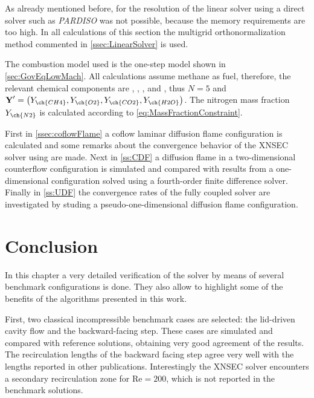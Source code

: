 As already mentioned before, for the resolution of the linear solver using a direct solver such as \textit{PARDISO} was not possible, because the memory requirements are too high. In all calculations of this section the multigrid orthonormalization method commented in \cref{ssec:LinearSolver} is used.

The combustion model used is the one-step model shown in \cref{sec:GovEqLowMach}. All calculations assume methane as fuel, therefore, the relevant chemical components are , , ,  and , thus $N = 5$ and $\vec{Y}' = \left(Y_{\ch{CH4}},Y_{\ch{O2}},Y_{\ch{CO2}},Y_{\ch{H2O}}\right)$. The nitrogen mass fraction $Y_{\ch{N2}}$ is calculated according to \cref{eq:MassFractionConstraint}.%

First in \cref{ssec:coflowFlame} a coflow laminar diffusion flame configuration is calculated and some remarks about the convergence behavior of the XNSEC solver using are made. Next in \cref{ss:CDF} a diffusion flame in a two-dimensional counterflow configuration is simulated and compared with results from a one-dimensional configuration solved using a fourth-order finite difference solver. Finally in \cref{ss:UDF} the convergence rates of the fully coupled solver are investigated by studing a pseudo-one-dimensional diffusion flame configuration.





\section{Conclusion}
In this chapter a very detailed verification of the solver by means of several benchmark configurations is done. They also allow to highlight some of the benefits of the algorithms presented in this work.

First, two classical incompressible benchmark cases are selected: the lid-driven cavity flow and the backward-facing step. These cases are simulated and compared with reference solutions, obtaining very good agreement of the results. The recirculation lengths of the backward facing step agree very well with the lengths reported in other publications. Interestingly the XNSEC solver encounters a secondary recirculation zone for $\text{Re} = 200$, which is not reported in the benchmark solutions.

